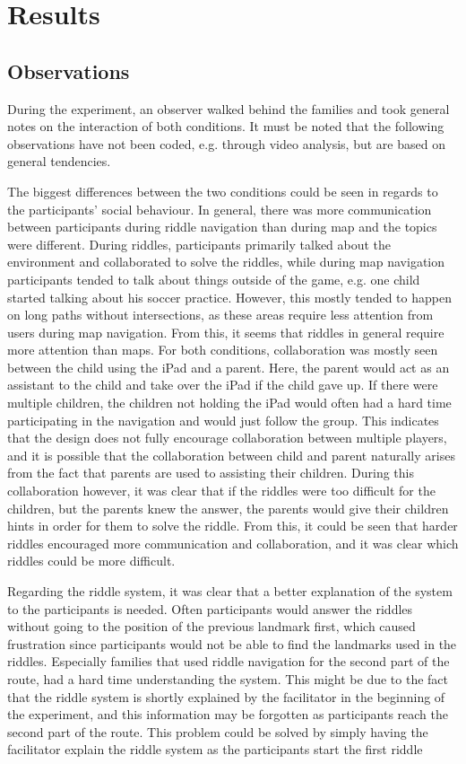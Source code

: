 \section{Results}

\subsection{Observations}
During the experiment, an observer walked behind the families and took general notes on the interaction of both conditions. It must be noted that the following observations have not been coded, e.g. through video analysis, but are based on general tendencies.

The biggest differences between the two conditions could be seen in regards to the participants' social behaviour. In general, there was more communication between participants during riddle navigation than during map and the topics were different. During riddles, participants primarily talked about the environment and collaborated to solve the riddles, while during map navigation participants tended to talk about things outside of the game, e.g. one child started talking about his soccer practice. However, this mostly tended to happen on long paths without intersections, as these areas require less attention from users during map navigation. From this, it seems that riddles in general require more attention than maps. For both conditions, collaboration was mostly seen between the child using the iPad and a parent. Here, the parent would act as an assistant to the child and take over the iPad if the child gave up. If there were multiple children, the children not holding the iPad would often had a hard time participating in the navigation and would just follow the group. This indicates that the design does not fully encourage collaboration between multiple players, and it is possible that the collaboration between child and parent naturally arises from the fact that parents are used to assisting their children. During this collaboration however, it was clear that if the riddles were too difficult for the children, but the parents knew the answer, the parents would give their children hints in order for them to solve the riddle. From this, it could be seen that harder riddles encouraged more communication and collaboration, and it was clear which riddles could be more difficult.

Regarding the riddle system, it was clear that a better explanation of the system to the participants is needed. Often participants would answer the riddles without going to the position of the previous landmark first, which caused frustration since participants would not be able to find the landmarks used in the riddles. Especially families that used riddle navigation for the second part of the route, had a hard time understanding the system. This might be due to the fact that the riddle system is shortly explained by the facilitator in the beginning of the experiment, and this information may be forgotten as participants reach the second part of the route. This problem could be solved by simply having the facilitator explain the riddle system as the participants start the first riddle

